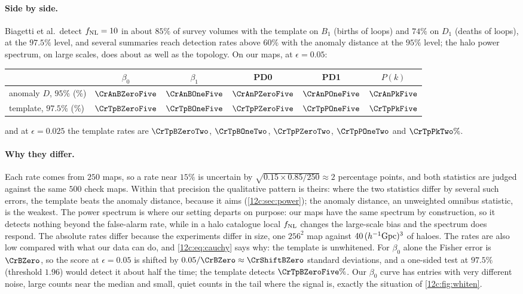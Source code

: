 \paragraph{Side by side.} Biagetti et al.\ detect $f_{\rm NL}=10$ in about $85\%$ of survey volumes with the template on $B_1$ (births of loops)
and $74\%$ on $D_1$ (deaths of loops), at the $97.5\%$ level, and several summaries reach detection rates above $60\%$ with the anomaly distance
at the $95\%$ level; the halo power spectrum, on large scales, does about as well as the topology. On our maps, at $\epsilon=0.05$:
\begin{center}
\small
\begin{tabular}{lccccc}
\toprule
 & $\beta_0$ & $\beta_1$ & PD0 & PD1 & $P(k)$\\
\midrule
anomaly $D$, $95\%$ (\%) & $\CrAnBZeroFive$ & $\CrAnBOneFive$ & $\CrAnPZeroFive$ & $\CrAnPOneFive$ & $\CrAnPkFive$\\
template, $97.5\%$ (\%) & $\CrTpBZeroFive$ & $\CrTpBOneFive$ & $\CrTpPZeroFive$ & $\CrTpPOneFive$ & $\CrTpPkFive$\\
\bottomrule
\end{tabular}
\end{center}
and at $\epsilon=0.025$ the template rates are $\CrTpBZeroTwo$, $\CrTpBOneTwo$, $\CrTpPZeroTwo$, $\CrTpPOneTwo$ and $\CrTpPkTwo\%$.

\paragraph{Why they differ.} Each rate comes from $250$ maps, so a rate near $15\%$ is uncertain by
$\sqrt{0.15\times0.85/250}\approx2$ percentage points, and both statistics are judged against the same $500$ check maps. Within
that precision the qualitative pattern is theirs: where the two statistics differ by several such errors, the template beats
the anomaly distance, because it aims (\cref{12c:sec:power}); the anomaly distance, an unweighted omnibus statistic, is the
weakest. The power spectrum is where our setting
departs on purpose: our maps have the same spectrum by construction, so it detects nothing beyond the false-alarm rate, while in a halo catalogue
local $f_{\rm NL}$ changes the large-scale bias and the spectrum does respond. The absolute rates differ because the experiments differ in size, one
$256^2$ map against $40\,(h^{-1}{\rm Gpc})^3$ of haloes. The rates are also low compared with what our data can do, and \eqref{12c:eq:cauchy} says
why: the template is unwhitened. For $\beta_0$ alone the Fisher error is $\CrBZero$, so the score at $\epsilon=0.05$ is shifted by
$0.05/\CrBZero\approx\CrShiftBZero$ standard deviations, and a one-sided test at $97.5\%$ (threshold $1.96$) would detect it about half the time; the template
detects $\CrTpBZeroFive\%$. Our $\beta_0$ curve has entries with very different noise, large counts near the median and small, quiet counts in the
tail where the signal is, exactly the situation of \cref{12c:fig:whiten}.

